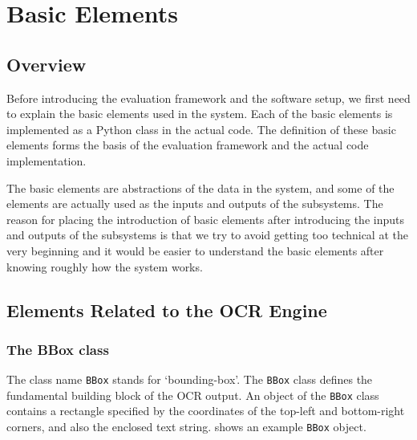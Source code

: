 
\chapter{Basic Elements}
\label{chap:basic-elem}

\ifpdf
    \graphicspath{{Chapter6/Figs/Raster/}{Chapter6/Figs/PDF/}{Chapter6/Figs/}}
\else
    \graphicspath{{Chapter6/Figs/Vector/}{Chapter6/Figs/}}
\fi


\section{Overview}

Before introducing the evaluation framework and the software setup, we first need to explain the basic elements used in the system. Each of the basic elements is implemented as a Python class in the actual code. The definition of these basic elements forms the basis of the evaluation framework and the actual code implementation.

The basic elements are abstractions of the data in the system, and some of the elements are actually used as the inputs and outputs of the subsystems. The reason for placing the introduction of basic elements after introducing the inputs and outputs of the subsystems is that we try to avoid getting too technical at the very beginning and it would be easier to understand the basic elements after knowing roughly how the system works. 

\section{Elements Related to the OCR Engine}

\subsection{The BBox class}

The class name \texttt{BBox} stands for `bounding-box'. The \texttt{BBox} class defines the fundamental building block of the OCR output. An object of the \texttt{BBox} class contains a rectangle specified by the coordinates of the top-left and bottom-right corners, and also the enclosed text string.  shows an example \texttt{BBox} object. 

